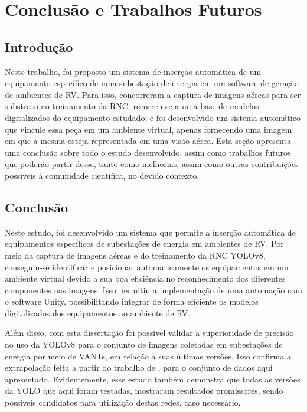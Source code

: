 \chapter{Conclusão e Trabalhos Futuros}

\section{Introdução} 

Neste trabalho, foi proposto um sistema de inserção automática de um equipamento específico de uma subestação de energia em um software de geração de ambientes de RV. Para isso, concorreram a captura de imagens aéreas para ser substrato ao treinamento da RNC; recorreu-se a uma base de modelos digitalizados do equipamento estudado; e foi desenvolvido um sistema automático que vincule essa peça em um ambiente virtual, apenas fornecendo uma imagem em que a mesma esteja representada em uma visão aérea. Esta seção apresenta uma conclusão sobre todo o estudo desenvolvido, assim como trabalhos futuros que poderão partir desse, tanto como melhorias, assim como outras contribuições possíveis à comunidade científica, no devido contexto.

\section{Conclusão} 

Neste estudo, foi desenvolvido um sistema que permite a inserção automática de equipamentos específicos de subestações de energia em ambientes de RV. Por meio da captura de imagens aéreas e do treinamento da RNC YOLOv8, conseguiu-se identificar e posicionar automaticamente os equipamentos em um ambiente virtual devido a sua boa eficiência no reconhecimento dos diferentes componentes nas imagens. Isso permitiu a implementação de uma automação com o software Unity, possibilitando integrar de forma eficiente os modelos digitalizados dos equipamentos ao ambiente de RV.

Além disso, com esta dissertação foi possível validar a superioridade de precisão no uso da YOLOv8 para o conjunto de imagens coletadas em subestações de energia por meio de VANTs, em relação a suas últimas versões. Isso confirma a extrapolação feita a partir do trabalho de , para o conjunto de dados aqui apresentado. Evidentemente, esse estudo também demonstra que todas as versões da YOLO que aqui foram testadas, mostraram resultados promissores, sendo possíveis candidatos para utilização destas redes, caso necessário. 

